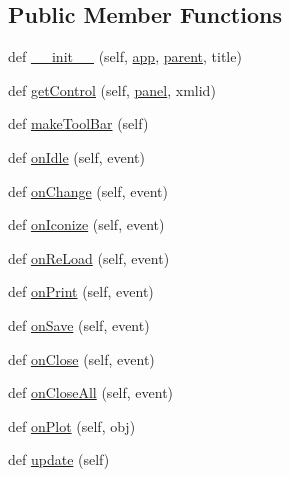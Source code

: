 \subsection*{Public Member Functions}
\begin{DoxyCompactItemize}
\item 
def \hyperlink{classGraphFrame_1_1GraphFrame_ad9dbffb33edafd35f798052e29ace443}{\+\_\+\+\_\+init\+\_\+\+\_\+} (self, \hyperlink{classGraphFrame_1_1GraphFrame_adffc22a75c32a310a9f15d5d9d39c585}{app}, \hyperlink{classGraphFrame_1_1GraphFrame_a2e037073bd21eb4b1ce33d0763c553ac}{parent}, title)
\item 
def \hyperlink{classGraphFrame_1_1GraphFrame_aa7c1ad6c83d55119ad9d14f7fe6b3179}{get\+Control} (self, \hyperlink{classGraphFrame_1_1GraphFrame_af52ab0f13e5117c0cdaa3cade3f04eda}{panel}, xmlid)
\item 
def \hyperlink{classGraphFrame_1_1GraphFrame_a63903bf4616f8d1d7602dfb86c123654}{make\+Tool\+Bar} (self)
\item 
def \hyperlink{classGraphFrame_1_1GraphFrame_aa2baa5d8bd7aed70f505e6a815a3b350}{on\+Idle} (self, event)
\item 
def \hyperlink{classGraphFrame_1_1GraphFrame_a46ef6b8a00bb885e5546bb7e12ef6223}{on\+Change} (self, event)
\item 
def \hyperlink{classGraphFrame_1_1GraphFrame_aae122b48f5b9f830f883192c8dbab6b2}{on\+Iconize} (self, event)
\item 
def \hyperlink{classGraphFrame_1_1GraphFrame_a7b18d46fe532780e2cb335195d245a46}{on\+Re\+Load} (self, event)
\item 
def \hyperlink{classGraphFrame_1_1GraphFrame_a3a50f27df2c9a224ca79506117392a6f}{on\+Print} (self, event)
\item 
def \hyperlink{classGraphFrame_1_1GraphFrame_ac512e14bd8704cb74de330cc75d4b106}{on\+Save} (self, event)
\item 
def \hyperlink{classGraphFrame_1_1GraphFrame_a6c2fa99d2cdb9a5a943daef19dae4e83}{on\+Close} (self, event)
\item 
def \hyperlink{classGraphFrame_1_1GraphFrame_af96c612fe973abb68cd576b3e4637a31}{on\+Close\+All} (self, event)
\item 
def \hyperlink{classGraphFrame_1_1GraphFrame_a2b974345cbf4d2655e6adf1af6f18b16}{on\+Plot} (self, obj)
\item 
def \hyperlink{classGraphFrame_1_1GraphFrame_ad7976cef3c7d76daef8085a3aba26916}{update} (self)
\end{DoxyCompactItemize}
